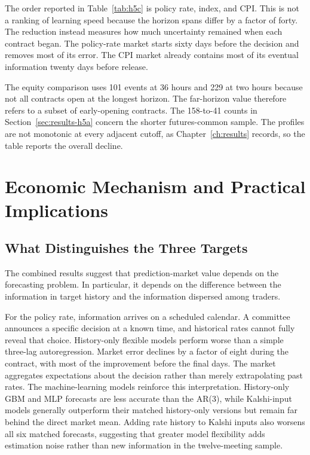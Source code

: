 \documentclass[12pt,a4paper]{report}
\begin{document}
The order reported in Table~\ref{tab:h5c} is policy rate, index, and CPI. This is not a ranking of learning
speed because the horizon spans differ by a factor of forty. The reduction
instead measures how much uncertainty remained when each contract began. The
policy-rate market starts sixty days before the decision and removes most of
its error. The CPI market already contains most of its eventual information
twenty days before release.

The equity comparison uses 101 events at 36 hours and 229 at two hours because
not all contracts open at the longest horizon. The far-horizon value therefore
refers to a subset of early-opening contracts. The 158-to-41 counts in
Section~\ref{sec:results-h5a} concern the shorter futures-common sample. The
profiles are not monotonic at every adjacent cutoff, as
Chapter~\ref{ch:results} records, so the table reports the overall decline.

\section{Economic Mechanism and Practical Implications}
\label{sec:interpretation}

\subsection{What Distinguishes the Three Targets}

The combined results suggest that prediction-market value depends on the
forecasting problem. In particular, it depends on the difference between the
information in target history and the information dispersed among traders.

For the policy rate, information arrives on a scheduled calendar. A committee
announces a specific decision at a known time, and historical rates cannot
fully reveal that choice. History-only flexible models perform worse than a
simple three-lag autoregression. Market error declines by a factor of eight
during the contract, with most of the improvement before the final days. The
market aggregates expectations about the decision rather than merely
extrapolating past rates. The machine-learning models reinforce this interpretation. History-only GBM and MLP forecasts are less accurate than the AR(3), while Kalshi-input models generally outperform their matched history-only versions but remain far behind the direct market mean. Adding rate history to Kalshi inputs also worsens all six matched forecasts, suggesting that greater model flexibility adds estimation noise rather than new information in the twelve-meeting sample.
\end{document}
